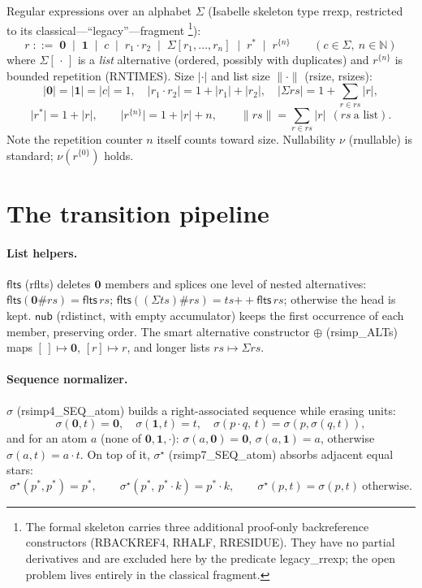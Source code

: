 \documentclass[11pt]{article}
\theoremstyle{remark}
\newcommand{\ZERO}{\mathbf{0}}
\newcommand{\ONE}{\mathbf{1}}
\newcommand{\rs}[1]{\lvert #1\rvert}                 %
\newcommand{\rss}[1]{\lVert #1\rVert}                %
\newcommand{\nub}{\mathsf{nub}}
\newcommand{\flts}{\mathsf{flts}}
\newcommand{\altsmart}{\oplus}
\newcommand{\seqnorm}{\sigma}
\newcommand{\seqstar}{\sigma^{\star}}
\newcommand{\nullable}{\nu}
\newcommand{\thy}[1]{\textsf{\small #1}}
\begin{document}
Regular expressions over an alphabet $\Sigma$ (Isabelle skeleton type
\thy{rrexp}, restricted to its classical---``legacy''---fragment%
\footnote{The formal skeleton carries three additional proof-only
backreference constructors (\thy{RBACKREF4}, \thy{RHALF}, \thy{RRESIDUE}).
They have no partial derivatives and are excluded here by the predicate
\thy{legacy\_rrexp}; the open problem lives entirely in the classical
fragment.}):
\[
r \;::=\; \ZERO \;\mid\; \ONE \;\mid\; c
 \;\mid\; r_1\cdot r_2 \;\mid\; \Sigma[r_1,\dots,r_n]
 \;\mid\; r^{*} \;\mid\; r^{\{n\}} \qquad (c\in\Sigma,\ n\in\mathbb{N})
\]
where $\Sigma[\,\cdot\,]$ is a \emph{list} alternative (ordered, possibly
with duplicates) and $r^{\{n\}}$ is bounded repetition (\thy{RNTIMES}).
Size $\rs{\cdot}$ and list size $\rss{\cdot}$ (\thy{rsize}, \thy{rsizes}):
\[
\rs{\ZERO}=\rs{\ONE}=\rs{c}=1,\quad
\rs{r_1\cdot r_2}=1+\rs{r_1}+\rs{r_2},\quad
\rs{\Sigma rs}=1+\textstyle\sum_{r\in rs}\rs{r},
\]
\[
\rs{r^{*}}=1+\rs{r},\qquad
\rs{r^{\{n\}}}=1+\rs{r}+n,\qquad
\rss{rs}=\textstyle\sum_{r\in rs}\rs{r}\ \ (rs\ \text{a list}).
\]
Note the repetition counter $n$ itself counts toward size.  Nullability
$\nullable$ (\thy{rnullable}) is standard; $\nullable(r^{\{0\}})$ holds.

\section{The transition pipeline}\label{sec:pipeline}

\paragraph{List helpers.}
$\flts$ (\thy{rflts}) deletes $\ZERO$ members and splices one level of nested
alternatives:
$\flts(\ZERO\#rs)=\flts\,rs$;\;
$\flts((\Sigma ts)\#rs)=ts\mathbin{+\!\!+}\flts\,rs$;\;
otherwise the head is kept.
$\nub$ (\thy{rdistinct}, with empty accumulator) keeps the first occurrence
of each member, preserving order.
The smart alternative constructor $\altsmart$ (\thy{rsimp\_ALTs}) maps
$[\,]\mapsto\ZERO$, $[r]\mapsto r$, and longer lists $rs\mapsto\Sigma rs$.

\paragraph{Sequence normalizer.}
$\seqnorm$ (\thy{rsimp4\_SEQ\_atom}) builds a right-associated sequence while
erasing units:
\[
\seqnorm(\ZERO,t)=\ZERO,\quad
\seqnorm(\ONE,t)=t,\quad
\seqnorm(p\cdot q,\,t)=\seqnorm(p,\seqnorm(q,t)),
\]
and for an atom $a$ (none of $\ZERO,\ONE,{\cdot}$):
$\seqnorm(a,\ZERO)=\ZERO$, $\seqnorm(a,\ONE)=a$, otherwise
$\seqnorm(a,t)=a\cdot t$.
On top of it, $\seqstar$ (\thy{rsimp7\_SEQ\_atom}) absorbs adjacent equal
stars:
\[
\seqstar(p^{*},p^{*})=p^{*},\qquad
\seqstar(p^{*},\,p^{*}\!\cdot k)=p^{*}\!\cdot k,\qquad
\seqstar(p,t)=\seqnorm(p,t)\ \text{otherwise}.
\]
\end{document}
